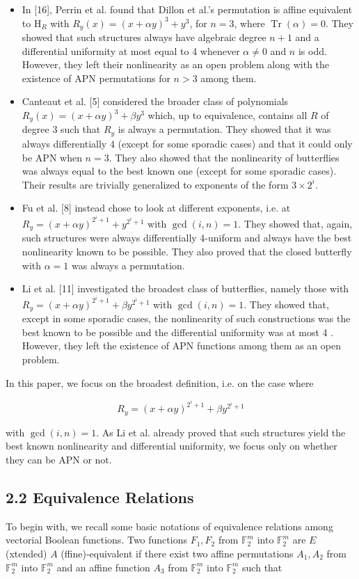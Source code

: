 \documentclass[10pt]{article}
\begin{document}
\begin{itemize}
  \item In [16], Perrin et al. found that Dillon et al.'s permutation is affine equivalent to $\mathrm{H}_{R}$ with $R_{y}(x)=(x+\alpha y)^{3}+y^{3}$, for $n=3$, where $\operatorname{Tr}(\alpha)=0$. They showed that such structures always have algebraic degree $n+1$ and a differential uniformity at most equal to 4 whenever $\alpha \neq 0$ and $n$ is odd. However, they left their nonlinearity as an open problem along with the existence of APN permutations for $n>3$ among them.
  \item Canteaut et al. [5] considered the broader class of polynomials $R_{y}(x)=(x+\alpha y)^{3}+\beta y^{3}$ which, up to equivalence, contains all $R$ of degree 3 such that $R_{y}$ is always a permutation. They showed that it was always differentially 4 (except for some sporadic cases) and that it could only be APN when $n=3$. They also showed that the nonlinearity of butterflies was always equal to the best known one (except for some sporadic cases). Their results are trivially generalized to exponents of the form $3 \times 2^{i}$.
  \item Fu et al. [8] instead chose to look at different exponents, i.e. at $R_{y}=(x+\alpha y)^{2^{i}+1}+y^{2^{i}+1}$ with $\operatorname{gcd}(i, n)=1$. They showed that, again, such structures were always differentially 4-uniform and always have the best nonlinearity known to be possible. They also proved that the closed butterfly with $\alpha=1$ was always a permutation.
  \item Li et al. [11] investigated the broadest class of butterflies, namely those with $R_{y}=(x+ \alpha y)^{2^{i}+1}+\beta y^{2^{i}+1}$ with $\operatorname{gcd}(i, n)=1$. They showed that, except in some sporadic cases, the nonlinearity of such constructions was the best known to be possible and the differential uniformity was at most 4 . However, they left the existence of APN functions among them as an open problem.
\end{itemize}

In this paper, we focus on the broadest definition, i.e. on the case where

$$
R_{y}=(x+\alpha y)^{2^{i}+1}+\beta y^{2^{i}+1}
$$

with $\operatorname{gcd}(i, n)=1$. As Li et al. already proved that such structures yield the best known nonlinearity and differential uniformity, we focus only on whether they can be APN or not.

\subsection*{2.2 Equivalence Relations}
To begin with, we recall some basic notations of equivalence relations among vectorial Boolean functions. Two functions $F_{1}, F_{2}$ from $\mathbb{F}_{2}^{m}$ into $\mathbb{F}_{2}^{m}$ are $E$ (xtended) $A$ (ffine)-equivalent if there exist two affine permutations $A_{1}, A_{2}$ from $\mathbb{F}_{2}^{m}$ into $\mathbb{F}_{2}^{m}$ and an affine function $A_{3}$ from $\mathbb{F}_{2}^{m}$ into $\mathbb{F}_{2}^{m}$ such that
\end{document}

